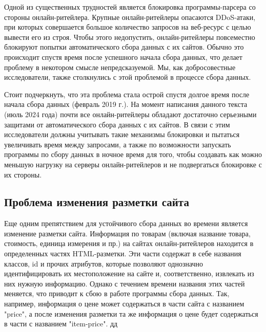 Одной из существенных трудностей является блокировка программы-парсера со стороны онлайн-ритейлера. Крупные онлайн-ритейлеры опасаются DDoS-атаки, при которых совершается большое количество запросов на веб-ресурс с целью вывести его из строя. Чтобы этого недопустить, онлайн-ритейлеры повсеместно блокируют попытки автоматического сбора данных с их сайтов. Обычно это происходит спустя время после успешного начала сбора данных, что делает проблему в некотором смысле непредсказуемой. Мы, как добросовестные исследователи, также столкнулись с этой проблемой в процессе сбора данных.

Стоит подчеркнуть, что эта проблема стала острой спустя долгое время после начала сбора данных (февраль 2019 г.). На момент написания данного текста (июль 2024 года) почти все онлайн-ритейлеры обладают достаточно серьезными защитами от автоматического сбора данных с их сайтов. В связи с этим исследователи должны учитывать такие механизмы блокировки и пытаться увеличивать время между запросами, а также по возможности запускать программы по сбору данных в ночное время для того, чтобы создавать как можно меньшую нагрузку на серверы онлайн-ритейлеров и не подвергаться блокировке с их стороны.

\subsection{Проблема изменения разметки сайта}\label{subsec:ch2/sec3/sub2}

Еще одним препятствием для устойчивого сбора данных во времени является изменение разметки сайта. Информация по товарам (включая название товара, стоимость, единица измерения и пр.) на сайтах онлайн-ритейлеров находится в определенных частях HTML-разметки. Эти части содержат в себе названия классов, id и прочих атрибутов, которые позволяют однозначно идентифицировать их местоположение на сайте и, соответственно, извлекать из них нужную информацию. Однако с течением времени названия этих частей меняется, что приводит к сбою в работе программы сбора данных. Так, например, информация о цене может содержаться в части сайта с названием "price", а после изменения разметки та же информация о цене будет содержаться в части с названием "item-price". дд





